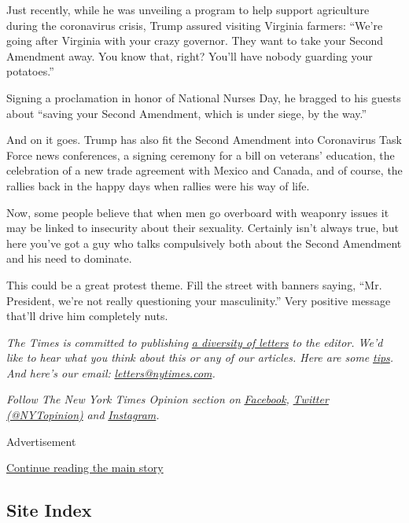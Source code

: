 Just recently, while he was unveiling a program to help support
agriculture during the coronavirus crisis, Trump assured visiting
Virginia farmers: ``We're going after Virginia with your crazy governor.
They want to take your Second Amendment away. You know that, right?
You'll have nobody guarding your potatoes.''

Signing a proclamation in honor of National Nurses Day, he bragged to
his guests about ``saving your Second Amendment, which is under siege,
by the way.''

And on it goes. Trump has also fit the Second Amendment into Coronavirus
Task Force news conferences, a signing ceremony for a bill on veterans'
education, the celebration of a new trade agreement with Mexico and
Canada, and of course, the rallies back in the happy days when rallies
were his way of life.

Now, some people believe that when men go overboard with weaponry issues
it may be linked to insecurity about their sexuality. Certainly isn't
always true, but here you've got a guy who talks compulsively both about
the Second Amendment and his need to dominate.

This could be a great protest theme. Fill the street with banners
saying, ``Mr. President, we're not really questioning your
masculinity.'' Very positive message that'll drive him completely nuts.

\emph{The Times is committed to publishing}
\href{https://www.nytimes.com/2019/01/31/opinion/letters/letters-to-editor-new-york-times-women.html}{\emph{a
diversity of letters}} \emph{to the editor. We'd like to hear what you
think about this or any of our articles. Here are some}
\href{https://help.nytimes.com/hc/en-us/articles/115014925288-How-to-submit-a-letter-to-the-editor}{\emph{tips}}\emph{.
And here's our email:}
\href{mailto:letters@nytimes.com}{\emph{letters@nytimes.com}}\emph{.}

\emph{Follow The New York Times Opinion section on}
\href{https://www.facebook.com/nytopinion}{\emph{Facebook}}\emph{,}
\href{http://twitter.com/NYTOpinion}{\emph{Twitter (@NYTopinion)}}
\emph{and}
\href{https://www.instagram.com/nytopinion/}{\emph{Instagram}}\emph{.}

Advertisement

\protect\hyperlink{after-bottom}{Continue reading the main story}

\hypertarget{site-index}{%
\subsection{Site Index}\label{site-index}}

